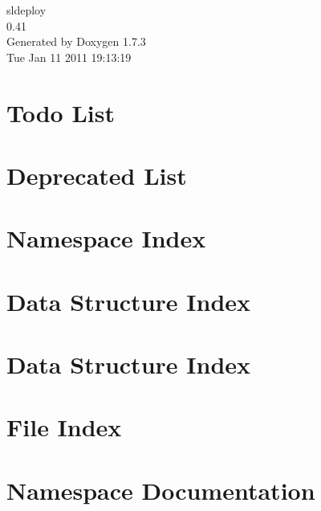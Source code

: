 \documentclass[a4paper]{book}
\begin{document}
\hypersetup{pageanchor=false}
\begin{titlepage}
\vspace*{7cm}
\begin{center}
{\Large sldeploy \\[1ex]\large 0.41 }\\
\vspace*{1cm}
{\large Generated by Doxygen 1.7.3}\\
\vspace*{0.5cm}
{\small Tue Jan 11 2011 19:13:19}\\
\end{center}
\end{titlepage}
\clearemptydoublepage
{}
\tableofcontents
\clearemptydoublepage
{}
\hypersetup{pageanchor=true}
\chapter{Todo List}
\label{todo}
\hypertarget{todo}{}

\chapter{Deprecated List}
\label{deprecated}
\hypertarget{deprecated}{}

\chapter{Namespace Index}

\chapter{Data Structure Index}

\chapter{Data Structure Index}

\chapter{File Index}

\chapter{Namespace Documentation}





\end{document}
